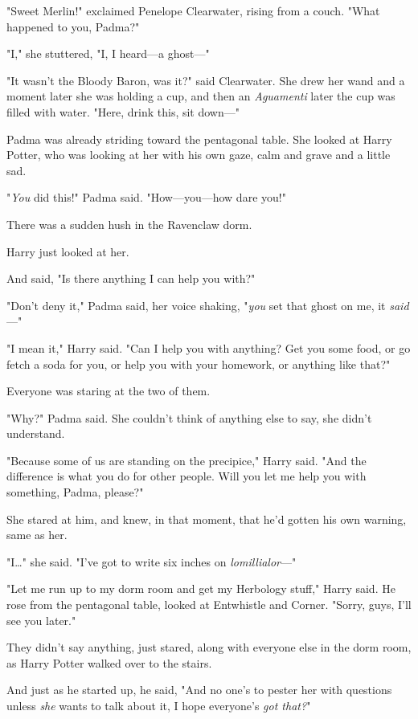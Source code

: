 "Sweet Merlin!" exclaimed Penelope Clearwater, rising from a couch. "What 
happened to you, Padma?"

"I," she stuttered, "I, I heard---a ghost---"

"It wasn't the Bloody Baron, was it?" said Clearwater. She drew her wand and a 
moment later she was holding a cup, and then an \emph{Aguamenti} later the cup 
was filled with water. "Here, drink this, sit down---"

Padma was already striding toward the pentagonal table. She looked at Harry 
Potter, who was looking at her with his own gaze, calm and grave and a little 
sad.

"\emph{You} did this!" Padma said. "How---you---how dare you!"

There was a sudden hush in the Ravenclaw dorm.

Harry just looked at her.

And said, "Is there anything I can help you with?"

"Don't deny it," Padma said, her voice shaking, "\emph{you} set that ghost on 
me, it \emph{said}---"

"I mean it," Harry said. "Can I help you with anything? Get you some food, or 
go fetch a soda for you, or help you with your homework, or anything like that?"

Everyone was staring at the two of them.

"Why?" Padma said. She couldn't think of anything else to say, she didn't 
understand.

"Because some of us are standing on the precipice," Harry said. "And the 
difference is what you do for other people. Will you let me help you with 
something, Padma, please?"

She stared at him, and knew, in that moment, that he'd gotten his own warning, 
same as her.

"I{\ldots}" she said. "I've got to write six inches on \emph{lomillialor}---"

"Let me run up to my dorm room and get my Herbology stuff," Harry said. He rose 
from the pentagonal table, looked at Entwhistle and Corner. "Sorry, guys, I'll 
see you later."

They didn't say anything, just stared, along with everyone else in the dorm 
room, as Harry Potter walked over to the stairs.

And just as he started up, he said, "And no one's to pester her with questions 
unless \emph{she} wants to talk about it, I hope everyone's \emph{got that?}"

